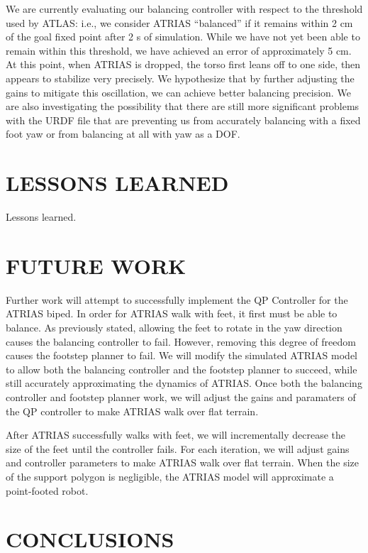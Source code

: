 \documentclass[letterpaper, 10 pt, conference]{ieeeconf}  %
\begin{document}
We are currently evaluating our balancing controller with respect to the threshold used by ATLAS: i.e., we consider ATRIAS “balanced” if it remains within 2 cm of the goal fixed point after 2 s of simulation. While we have not yet been able to remain within this threshold, we have achieved an error of approximately 5 cm. At this point, when ATRIAS is dropped, the torso first leans off to one side, then appears to stabilize very precisely. We hypothesize that by further adjusting the gains to mitigate this oscillation, we can achieve better balancing precision. We are also investigating the possibility that there are still more significant problems with the URDF file that are preventing us from accurately balancing with a fixed foot yaw or from balancing at all with yaw as a DOF.

\section{LESSONS LEARNED}

Lessons learned.

\section{FUTURE WORK}
Further work will attempt to successfully implement the QP Controller for the ATRIAS biped. In order for ATRIAS walk with feet, it first must be able to balance. As previously stated, allowing the feet to rotate in the yaw direction causes the balancing controller to fail. However, removing this degree of freedom causes the footstep planner to fail. We will modify the simulated ATRIAS model to allow both the balancing controller and the footstep planner to succeed, while still accurately approximating the dynamics of ATRIAS. Once both the balancing controller and footstep planner work, we will adjust the gains and paramaters of the QP controller to make ATRIAS walk over flat terrain. 

After ATRIAS successfully walks with feet, we will incrementally decrease the size of the feet until the controller fails. For each iteration, we will adjust gains and controller parameters to make ATRIAS walk over flat terrain. When the size of the support polygon is negligible, the ATRIAS model will approximate a point-footed robot.

\section{CONCLUSIONS}
\end{document}
